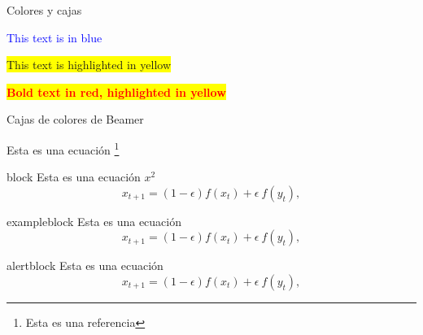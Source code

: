 \documentclass{beamer}
\begin{document}
\begin{frame}[bottom]{Colores y cajas}
 
 \textcolor{blue}{This text is in blue}
 
 \vspace{0.5cm}
 
 \colorbox{yellow}{This text is highlighted in yellow}
 
 \vspace{0.5cm}
 
 \colorbox{yellow}{ 
    \textcolor{red}{ 
        \textbf{ 
            Bold text in red, highlighted in yellow 
        } 
    } 
 } 
 
 \vspace{0.5cm}
 
 
 \vspace{0.5cm}
 
 \setlength{\fboxrule}{4pt} 
 
 \vspace{0.5cm}
 
 \setlength{\fboxrule}{4pt} 
\setlength{\fboxsep}{5pt} 
 
\end{frame}



\begin{frame}{Cajas de colores de Beamer}
  
  Esta es una ecuación \footnote{Esta es una referencia}
  
\begin{block}{block}
Esta es una ecuación $x^2$
\[
x_{t+1} = (1-\epsilon)f(x_t)+\epsilon ~ f(y_t),
\]
\end{block}

\begin{exampleblock}{exampleblock}
Esta es una ecuación
\[
x_{t+1} = (1-\epsilon)f(x_t)+\epsilon ~ f(y_t),
\]
\end{exampleblock}

\begin{alertblock}{alertblock}
Esta es una ecuación
\[
x_{t+1} = (1-\epsilon)f(x_t)+\epsilon ~ f(y_t),
\]
\end{alertblock}
 
\end{frame}
\end{document}
